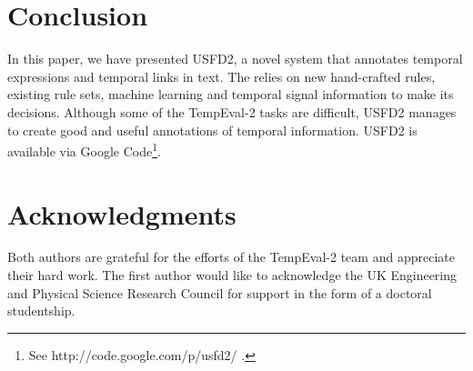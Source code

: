 \documentclass[11pt]{article}
\begin{document}
\section{Conclusion}
\label{conclusion}

In this paper, we have presented USFD2, a novel system that annotates temporal expressions and temporal links in text. The relies on new hand-crafted rules, existing rule sets, machine learning and temporal signal information to make its decisions. Although some of the TempEval-2 tasks are difficult, USFD2 manages to create good and useful annotations of temporal information. USFD2 is available via Google Code\footnote{See http://code.google.com/p/usfd2/ .}.

\section*{Acknowledgments}
Both authors are grateful for the efforts of the TempEval-2 team and appreciate their hard work. The first author would like to acknowledge the UK Engineering and Physical Science Research Council for support in the form of a doctoral studentship.



\end{document}
